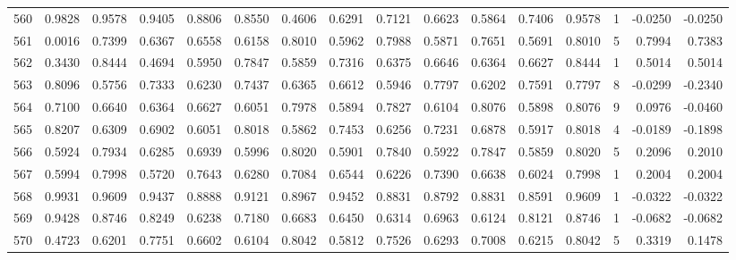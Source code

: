 \begin{tabular}{lrrrrrrrrrrrrrrr}
560 &      0.9828 &  0.9578 &  0.9405 &  0.8806 &  0.8550 &  0.4606 &  0.6291 &  0.7121 &  0.6623 &  0.5864 &   0.7406 &     0.9578 &      1 &                   -0.0250 &                    -0.0250 \\
561 &      0.0016 &  0.7399 &  0.6367 &  0.6558 &  0.6158 &  0.8010 &  0.5962 &  0.7988 &  0.5871 &  0.7651 &   0.5691 &     0.8010 &      5 &                    0.7994 &                     0.7383 \\
562 &      0.3430 &  0.8444 &  0.4694 &  0.5950 &  0.7847 &  0.5859 &  0.7316 &  0.6375 &  0.6646 &  0.6364 &   0.6627 &     0.8444 &      1 &                    0.5014 &                     0.5014 \\
563 &      0.8096 &  0.5756 &  0.7333 &  0.6230 &  0.7437 &  0.6365 &  0.6612 &  0.5946 &  0.7797 &  0.6202 &   0.7591 &     0.7797 &      8 &                   -0.0299 &                    -0.2340 \\
564 &      0.7100 &  0.6640 &  0.6364 &  0.6627 &  0.6051 &  0.7978 &  0.5894 &  0.7827 &  0.6104 &  0.8076 &   0.5898 &     0.8076 &      9 &                    0.0976 &                    -0.0460 \\
565 &      0.8207 &  0.6309 &  0.6902 &  0.6051 &  0.8018 &  0.5862 &  0.7453 &  0.6256 &  0.7231 &  0.6878 &   0.5917 &     0.8018 &      4 &                   -0.0189 &                    -0.1898 \\
566 &      0.5924 &  0.7934 &  0.6285 &  0.6939 &  0.5996 &  0.8020 &  0.5901 &  0.7840 &  0.5922 &  0.7847 &   0.5859 &     0.8020 &      5 &                    0.2096 &                     0.2010 \\
567 &      0.5994 &  0.7998 &  0.5720 &  0.7643 &  0.6280 &  0.7084 &  0.6544 &  0.6226 &  0.7390 &  0.6638 &   0.6024 &     0.7998 &      1 &                    0.2004 &                     0.2004 \\
568 &      0.9931 &  0.9609 &  0.9437 &  0.8888 &  0.9121 &  0.8967 &  0.9452 &  0.8831 &  0.8792 &  0.8831 &   0.8591 &     0.9609 &      1 &                   -0.0322 &                    -0.0322 \\
569 &      0.9428 &  0.8746 &  0.8249 &  0.6238 &  0.7180 &  0.6683 &  0.6450 &  0.6314 &  0.6963 &  0.6124 &   0.8121 &     0.8746 &      1 &                   -0.0682 &                    -0.0682 \\
570 &      0.4723 &  0.6201 &  0.7751 &  0.6602 &  0.6104 &  0.8042 &  0.5812 &  0.7526 &  0.6293 &  0.7008 &   0.6215 &     0.8042 &      5 &                    0.3319 &                     0.1478 \\

\end{tabular}
